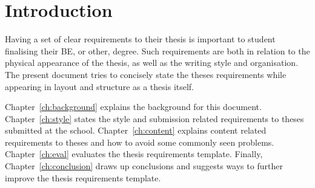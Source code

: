 \chapter{Introduction}\label{ch:intro}

Having a set of clear requirements to their thesis is important to student
finalising their BE, or other, degree.  Such requirements are both in
relation to the physical appearance of the thesis, as well as the writing
style and organisation.  The present document tries to concisely state the
theses requirements while appearing in layout and structure as a thesis
itself.

Chapter~\ref{ch:background} explains the background for this document.
Chapter~\ref{ch:style} states the style and submission related requirements
to theses submitted at the school.
Chapter~\ref{ch:content} explains content related requirements to theses and
how to avoid some commonly seen problems.
Chapter~\ref{ch:eval} evaluates the thesis requirements template.  Finally,
Chapter~\ref{ch:conclusion} draws up conclusions and suggests ways to
further improve the thesis requirements template.


